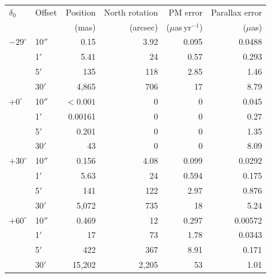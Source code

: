 \begin{tabular}{llrrrr}
\toprule
$\delta_0$ & Offset & Position & North rotation & PM error & Parallax error \\
 & & (mas) & (arcsec) & ($\mu$as\,yr$^{-1}$) & ($\mu$as) \\
\midrule
$-29^\circ$ & 10$''$ & 0.15 & 3.92 & 0.095 & 0.0488 \\
 & 1$'$ & 5.41 & 24 & 0.57 & 0.293 \\
 & 5$'$ & 135 & 118 & 2.85 & 1.46 \\
 & 30$'$ & 4{,}865 & 706 & 17 & 8.79 \\
\midrule
$+0^\circ$ & 10$''$ & $<0.001$ & 0 & 0 & 0.045 \\
 & 1$'$ & 0.00161 & 0 & 0 & 0.27 \\
 & 5$'$ & 0.201 & 0 & 0 & 1.35 \\
 & 30$'$ & 43 & 0 & 0 & 8.09 \\
\midrule
$+30^\circ$ & 10$''$ & 0.156 & 4.08 & 0.099 & 0.0292 \\
 & 1$'$ & 5.63 & 24 & 0.594 & 0.175 \\
 & 5$'$ & 141 & 122 & 2.97 & 0.876 \\
 & 30$'$ & 5{,}072 & 735 & 18 & 5.24 \\
\midrule
$+60^\circ$ & 10$''$ & 0.469 & 12 & 0.297 & 0.00572 \\
 & 1$'$ & 17 & 73 & 1.78 & 0.0343 \\
 & 5$'$ & 422 & 367 & 8.91 & 0.171 \\
 & 30$'$ & 15{,}202 & 2{,}205 & 53 & 1.01 \\
\bottomrule
\end{tabular}
